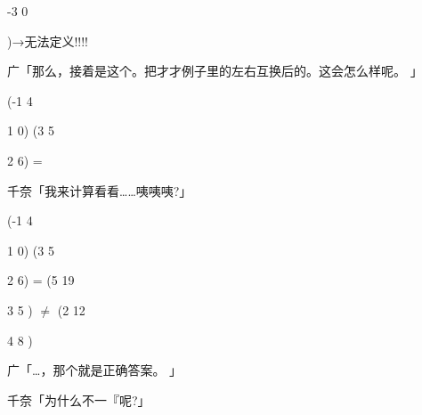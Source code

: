 -3 0\par
)→无法定义!!!!\par
广「那么，接着是这个。把才才例子里的左右互换后的。这会怎么样呢。 」\par
(-1 4\par
1 0) (3 5\par
2 6) =\par
千奈「我来计算看看……咦咦咦?」\par
(-1 4\par
1 0) (3 5\par
2 6) = (5 19\par
3 5 ) $\neq$ (2 12\par
4 8 )\par
广「…，那个就是正确答案。 」\par
千奈「为什么不一『呢?」\par

